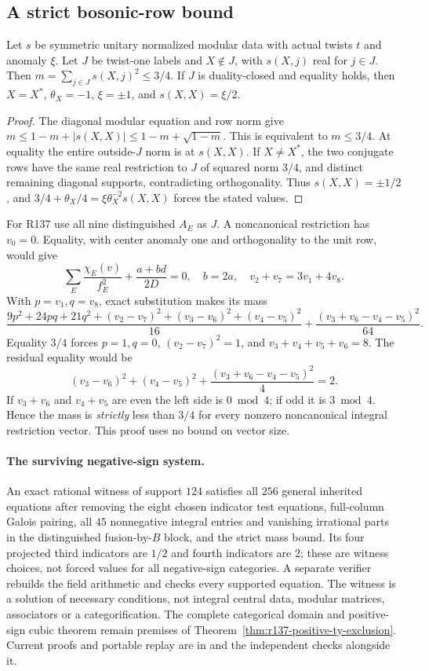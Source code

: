 \subsection{A strict bosonic-row bound}
\begin{lemma}\label{lem:r137-bosonic-mass}
Let $s$ be symmetric unitary normalized modular data with actual
twists $t$ and anomaly $\xi$. Let $J$ be twist-one labels and $X\notin J$,
with $s(X,j)$ real for $j\in J$. Then
$m=\sum_{j\in J}s(X,j)^2\le3/4$.
If $J$ is duality-closed and equality holds, then $X=X^*$,
$\theta_X=-1$, $\xi=\pm1$, and $s(X,X)=\xi/2$.
\end{lemma}
\begin{proof}
The diagonal modular equation and row norm give
$m\le1-m+|s(X,X)|\le1-m+\sqrt{1-m}$.
This is equivalent to $m\le3/4$.
At equality the entire outside-$J$ norm is at $s(X,X)$.
If $X\ne X^*$, the two conjugate rows have the same real restriction
to $J$ of squared norm $3/4$, and distinct remaining diagonal supports,
contradicting orthogonality. Thus $s(X,X)=\pm1/2$, and
$3/4+\theta_X/4=\xi\theta_X^{-2}s(X,X)$ forces the stated values.
\end{proof}

For R137 use all nine distinguished $A_E$ as $J$. A noncanonical
restriction has $v_0=0$. Equality, with center anomaly one and
orthogonality to the unit row, would give
\[
\sum_E\frac{\chi_E(v)}{f_E^2}+\frac{a+bd}{2D}=0,
\quad b=2a,\quad v_2+v_7=3v_1+4v_8.
\]
With $p=v_1,q=v_8$, exact substitution makes its mass
\[
\frac{9p^2+24pq+21q^2+(v_2-v_7)^2+(v_3-v_6)^2+(v_4-v_5)^2}{16}
+\frac{(v_3+v_6-v_4-v_5)^2}{64}.
\]
Equality $3/4$ forces $p=1,q=0$, $(v_2-v_7)^2=1$, and
$v_3+v_4+v_5+v_6=8$. The residual equality would be
\[
(v_3-v_6)^2+(v_4-v_5)^2+
\frac{(v_3+v_6-v_4-v_5)^2}{4}=2.
\]
If $v_3+v_6$ and $v_4+v_5$ are even the left side is $0\bmod4$;
if odd it is $3\bmod4$. Hence the mass is \emph{strictly} less than
$3/4$ for every nonzero noncanonical integral restriction vector.
This proof uses no bound on vector size.

\paragraph{The surviving negative-sign system.}
An exact rational witness of support $124$ satisfies all $256$ general
inherited equations after removing the eight chosen indicator test
equations, full-column Galois pairing, all $45$ nonnegative integral
entries and vanishing irrational parts in the distinguished fusion-by-$B$
block, and the strict mass bound. Its four projected third indicators
are $1/2$ and fourth indicators are $2$; these are witness choices,
not forced values for all negative-sign categories. A separate verifier
rebuilds the field arithmetic and checks every supported equation.
The witness is a solution of necessary conditions, not integral
central data, modular matrices, associators or a categorification.
The complete categorical domain and positive-sign cubic theorem
remain premises of Theorem~\ref{thm:r137-positive-ty-exclusion}.
Current proofs and portable replay are in
 and the independent
 checks alongside it.
